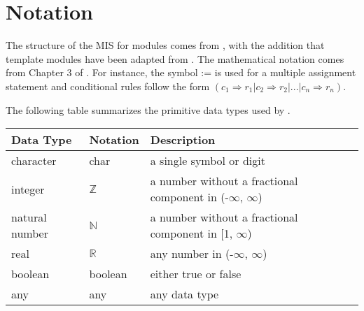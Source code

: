 \documentclass[12pt, titlepage]{article}
\begin{document}
\section{Notation}


The structure of the MIS for modules comes from \citet{HoffmanAndStrooper1995},
with the addition that template modules have been adapted from
\cite{GhezziEtAl2003}.  The mathematical notation comes from Chapter 3 of
\citet{HoffmanAndStrooper1995}.  For instance, the symbol := is used for a
multiple assignment statement and conditional rules follow the form $(c_1
\Rightarrow r_1 | c_2 \Rightarrow r_2 | ... | c_n \Rightarrow r_n )$.

The following table summarizes the primitive data types used by \progname.

\begin{center}
  \renewcommand{\arraystretch}{1.2}
  \noindent
  \begin{tabular}{l l p{7.5cm}}
    \toprule
    \textbf{Data Type} & \textbf{Notation} & \textbf{Description}\\
    \midrule
    character & char & a single symbol or digit\\
    integer & $\mathbb{Z}$ & a number without a fractional component
    in (-$\infty$, $\infty$) \\
    natural number & $\mathbb{N}$ & a number without a fractional
    component in [1, $\infty$) \\
    real & $\mathbb{R}$ & any number in (-$\infty$, $\infty$)\\
    boolean & boolean & either true or false\\
    any & any & any data type\\
    \bottomrule
  \end{tabular}
\end{center}
\end{document}
